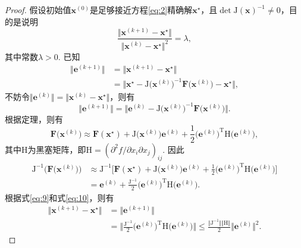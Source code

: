 \documentclass[cn,12pt,founder,a4paper]{elegantpaper}
\newcommand{\transpose}{\mathrm{T}}
\newcommand{\J}{\b{\mathrm{J}}}
\renewcommand{\H}{\b{\mathrm{H}}}
\renewcommand{\b}{\boldsymbol}
\begin{document}
\begin{proof}
  假设初始值\(\b{x}^{(0)}\)是足够接近方程\eqref{eq:2}精确解\(\b{x}^\star\)，且\(\det\J(\b{x})^{-1}\ne 0\)，目的是说明
  \[\frac{\Vert\b{x}^{(k+1)}-\b{x}^\star\Vert}{\Vert\b{x}^{(k)}-\b{x}^\star\Vert^2}=\lambda,\]
  其中常数\(\lambda>0\).
  已知
  \begin{align*}
    \big\Vert\b{e}^{(k+1)}\big\Vert&=\big\Vert\b{x}^{(k+1)}-\b{x}^{\star}\big\Vert\\
    &=\big\Vert\b{x}^\star-\J\big(\b{x}^{(k)}\big)^{-1}\b{F}\big(\b{x}^{(k)}\big)-\b{x}^{\star}\big\Vert,
  \end{align*}
  不妨令\(\big\Vert\b{e}^{(k)}\big\Vert=\big\Vert\b{x}^{(k)}-\b{x}^\star\big\Vert\)，则有
  \begin{equation}\label{eq:9}
    \big\Vert\b{e}^{(k+1)}\big\Vert=\big\Vert\b{e}^{(k)}-\J\big(\b{x}^{(k)}\big)^{-1}\b{F}\big(\b{x}^{(k)}\big)\big\Vert.
  \end{equation}
  根据定理，则有
  \[\b{F}\big(\b{x}^{(k)}\big)\approx\b{F}(\b{x}^\star)+\J\big(\b{x}^{(k)}\big)\b{e}^{(k)}+\frac{1}{2}\big(\b{e}^{(k)}\big)^\transpose\H\big(\b{e}^{(k)}\big),\]
  其中\(\H\)为黑塞矩阵，即\(\H=({\partial^2 f}/{\partial x_i\partial x_j})_{ij}\).
  因此
  \begin{equation}\label{eq:10}
    \begin{aligned}
      \J^{-1}\big(\b{F}\big(\b{x}^{(k)}\big)\big)&\approx\J^{-1}\Big[\b{F}(\b{x}^\star)+\J\big(\b{x}^{(k)}\big)\b{e}^{(k)}+\frac{1}{2}\big(\b{e}^{(k)}\big)^\transpose\H\big(\b{e}^{(k)}\big)\Big]\\
      &=\b{e}^{(k)}+\frac{\J^{-1}}{2}\big(\b{e}^{(k)}\big)^\transpose\H\big(\b{e}^{(k)}\big).
    \end{aligned}
  \end{equation}
  根据式\eqref{eq:9}和式\eqref{eq:10}，则有
  \begin{align*}
    \big\Vert\b{x}^{(k+1)}-\b{x}^\star\big\Vert&=\big\Vert\b{e}^{(k+1)}\big\Vert\\
    &=\Big\Vert\frac{\J^{-1}}{2}\big(\b{e}^{(k)}\big)^\transpose\H\big(\b{e}^{(k)}\big)\Big\Vert\leqslant\frac{\Vert\J^{-1}\Vert\Vert\H\Vert}{2}\big\Vert\b{e}^{(k)}\big\Vert^2.
  \end{align*}
\end{proof}
\end{document}
